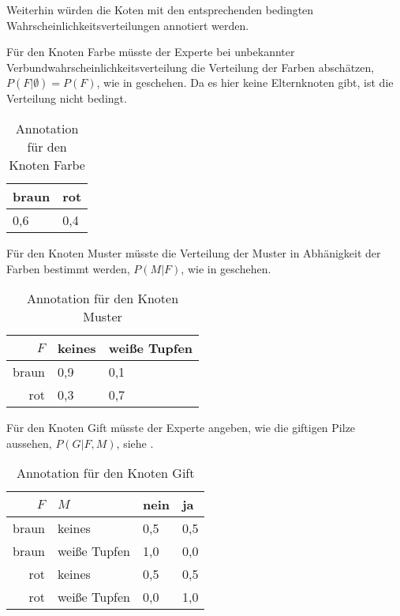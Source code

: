 \documentclass{llncs}
\begin{document}
Weiterhin würden die Koten mit den entsprechenden bedingten Wahrscheinlichkeitsverteilungen annotiert werden. 

Für den Knoten Farbe müsste der Experte bei unbekannter Verbundwahrscheinlichkeitsverteilung die Verteilung der Farben abschätzen, $P(F|\emptyset) = P(F)$, wie in  geschehen. Da es hier keine Elternknoten gibt, ist die Verteilung nicht bedingt.

\begin{table}[htb]
\caption{\label{tab:nodecolor}Annotation für den Knoten Farbe}
\centering
\begin{tabular}{l|l}
  braun & rot    \\ \hline
  0,6   & 0,4    \\
\end{tabular}
\end{table}

Für den Knoten Muster müsste die Verteilung der Muster in Abhänigkeit der Farben bestimmt werden, $P(M|F)$, wie in  geschehen.

\begin{table}[htb]
\caption{\label{tab:nodepattern}Annotation für den Knoten Muster}
\centering
\begin{tabular}{r|l|l}
  $F$   & keines & weiße Tupfen \\ \hline
  braun &    0,9 &          0,1 \\
  rot   &    0,3 &          0,7 \\
\end{tabular}
\end{table}

Für den Knoten Gift müsste der Experte angeben, wie die giftigen Pilze aussehen, $P(G|F,M)$, siehe .

\begin{table}[htb]
\caption{\label{tab:nodepoison}Annotation für den Knoten Gift}
\centering
\begin{tabular}{rl|l|l}
  $F$   & $M$          & nein &   ja \\ \hline
  braun & keines       &  0,5 &  0,5 \\
  braun & weiße Tupfen &  1,0 &  0,0 \\
  rot   & keines       &  0,5 &  0,5 \\
  rot   & weiße Tupfen &  0,0 &  1,0 \\
\end{tabular}
\end{table}
\end{document}

